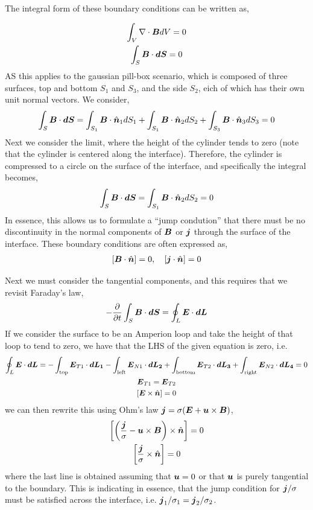 \documentclass{article}
\begin{document}
The integral form of these boundary conditions can be written as,

\begin{gather*}
    \int_V \nabla \cdot{\boldsymbol{B}} dV = 0\\
    \int_S \boldsymbol{B}\cdot\boldsymbol{dS} = 0
\end{gather*}
AS this applies to the gaussian pill-box scenario, which is composed of three
surfaces, top and bottom $S_1$ and $S_3$, and the side $S_2$, eich of which has
their own unit normal vectors. 
We consider, 
\begin{gather*}
    \int_S \boldsymbol{B}\cdot\boldsymbol{dS} = \int_{S_1}\boldsymbol{B}\cdot\hat{\boldsymbol{n}}_1dS_1 +
    \int_{S_1}\boldsymbol{B}\cdot\hat{\boldsymbol{n}}_2dS_2 + \int_{S_3}\boldsymbol{B}\cdot\hat{\boldsymbol{n}}_3dS_3 =
    0
\end{gather*}
Next we consider the limit, where the height of the cylinder tends to zero (note
that the cylinder is centered along the interface). Therefore, the cylinder is
compressed to a circle on the surface of the interface, and specifically the
integral becomes,
\begin{gather*}
    \int_S \boldsymbol{B}\cdot\boldsymbol{dS} = 
    \int_{S_1}\boldsymbol{B}\cdot\hat{\boldsymbol{n}}_2dS_2  = 0
\end{gather*}
In essence, this allows us to formulate a ``jump condution'' that there must be
no discontinuity in the normal components of $\boldsymbol{B}$ or $\boldsymbol{j}$ through the surface of the interface. These
boundary conditions are often expressed as, 
\begin{gather*}
    \left[\boldsymbol{B}\cdot\hat{\boldsymbol{n}}\right] = 0,
    \quad\left[\boldsymbol{j}\cdot\hat{\boldsymbol{n}}\right] = 0
\end{gather*}

Next we must consider the tangential components, and this requires that we
revisit Faraday's law, 
\begin{gather*}
    -\frac{\partial }{\partial t}\int_S\boldsymbol{B}\cdot\boldsymbol{dS} = \oint_L \boldsymbol{E}\cdot\boldsymbol{dL} 
\end{gather*}
If we consider the surface to be an Amperion loop and take the height of that
loop to tend to zero, we have that the LHS of the given equation is zero, i.e. 
\begin{gather*}
    \oint_L \boldsymbol{E}\cdot\boldsymbol{dL} = -\int_{\text{top}} \boldsymbol{E}_{T1}\cdot\boldsymbol{dL_1} - 
    \int_{\text{left}} \boldsymbol{E}_{N1}\cdot\boldsymbol{dL_2} +\int_{\text{bottom}} \boldsymbol{E}_{T2}\cdot\boldsymbol{dL_3}
    +\int_{\text{right}} \boldsymbol{E}_{N2}\cdot\boldsymbol{dL_4} = 0\\
    \boldsymbol{E}_{T1} = \boldsymbol{E}_{T2}\\
    \left[\boldsymbol{E} \times \hat{\boldsymbol{n}}\right] = 0
\end{gather*}
we can then rewrite this using Ohm's law $\boldsymbol{j} = \sigma(\boldsymbol{E} + \boldsymbol{u}\times\boldsymbol{B})$,
\begin{gather*}
    \left[\left(\frac{\boldsymbol{j}}{\sigma} - \boldsymbol{u}\times\boldsymbol{B}\right) \times \hat{\boldsymbol{n}}\right]
    = 0\\
    \left[\frac{\boldsymbol{j}}{\sigma} \times \hat{\boldsymbol{n}}\right] = 0
\end{gather*}
where the last line is obtained assuming that $\boldsymbol{u} = 0$ or that $\boldsymbol{u}$ is
purely tangential to the boundary. This is indicating in essence, that the jump
condition for $\boldsymbol{j}/\sigma$ must be satisfied across the interface, i.e.
$\boldsymbol{j}_1/\sigma_1 = \boldsymbol{j}_2/\sigma_2$. 
\end{document}
